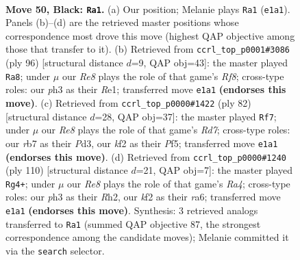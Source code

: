 \documentclass[11pt]{article}
\begin{document}
\clearpage

\begin{figure}[p]\centering
\begin{subfigure}{0.46\textwidth}\centering
\resizebox{\linewidth}{!}{%
\newchessgame
\chessboard[
  setfen={8/1R3p2/p3pk2/8/PR2P3/5P1P/5K2/4r3 b - - 7 50},
  showmover=false,
  pgfstyle=straightmove, color=movearrow, markmove={e1-a1}
]}
\caption{}
\end{subfigure}\hfill
\begin{subfigure}{0.46\textwidth}\centering
\resizebox{\linewidth}{!}{%
\newchessgame
\chessboard[
  setfen={5R2/6k1/pr4p1/3P1p2/5P1K/1r2P2P/8/4R3 w - - 3 49},
  showmover=false,
  pgfstyle=straightmove, color=movearrow, markmove={f8-a8}
]}
\caption{}
\end{subfigure}
\\[4pt]
\begin{subfigure}{0.46\textwidth}\centering
\resizebox{\linewidth}{!}{%
\newchessgame
\chessboard[
  setfen={8/3R2p1/2k3rp/2p2Pp1/8/1P1P4/P2K4/8 w - - 3 42},
  showmover=false,
  pgfstyle=straightmove, color=movearrow, markmove={d7-f7}
]}
\caption{}
\end{subfigure}\hfill
\begin{subfigure}{0.46\textwidth}\centering
\resizebox{\linewidth}{!}{%
\newchessgame
\chessboard[
  setfen={8/5pk1/rr1p3p/2pP4/R7/4PKP1/7R/8 w - - 0 56},
  showmover=false,
  pgfstyle=straightmove, color=movearrow, markmove={a4-g4}
]}
\caption{}
\end{subfigure}
\caption{\textbf{Move 50, Black: \texttt{Ra1}.} (a) Our position; Melanie plays \texttt{Ra1} (\texttt{e1a1}). Panels (b)--(d) are the retrieved master positions whose correspondence most drove this move (highest QAP objective among those that transfer to it). (b) Retrieved from \texttt{ccrl\_top\_p0001\#3086} (ply 96) [structural distance $d$=9, QAP obj=43]: the master played \texttt{Ra8}; under $\mu$ our \emph{Re8} plays the role of that game's \emph{Rf8}; cross-type roles: our \emph{p}h3 as their \emph{R}e1; transferred move \texttt{e1a1} \textbf{(endorses this move)}. (c) Retrieved from \texttt{ccrl\_top\_p0000\#1422} (ply 82) [structural distance $d$=28, QAP obj=37]: the master played \texttt{Rf7}; under $\mu$ our \emph{Re8} plays the role of that game's \emph{Rd7}; cross-type roles: our \emph{r}b7 as their \emph{P}d3, our \emph{k}f2 as their \emph{P}f5; transferred move \texttt{e1a1} \textbf{(endorses this move)}. (d) Retrieved from \texttt{ccrl\_top\_p0000\#1240} (ply 110) [structural distance $d$=21, QAP obj=7]: the master played \texttt{Rg4+}; under $\mu$ our \emph{Re8} plays the role of that game's \emph{Ra4}; cross-type roles: our \emph{p}h3 as their \emph{R}h2, our \emph{k}f2 as their \emph{r}a6; transferred move \texttt{e1a1} \textbf{(endorses this move)}. Synthesis: 3 retrieved analogs transferred to \texttt{Ra1} (summed QAP objective 87, the strongest correspondence among the candidate moves); Melanie committed it via the \texttt{search} selector.}
\label{fig:thought-m99}
\end{figure}
\end{document}
